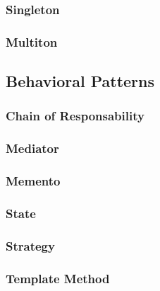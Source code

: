 \documentclass[a4paper]{article}
\begin{document}
\subsubsection{Singleton}

\subsubsection{Multiton}


\subsection{Behavioral Patterns}
\subsubsection{Chain of Responsability}

\subsubsection{Mediator}

\subsubsection{Memento}

\subsubsection{State}

\subsubsection{Strategy}

\subsubsection{Template Method}
\end{document}
